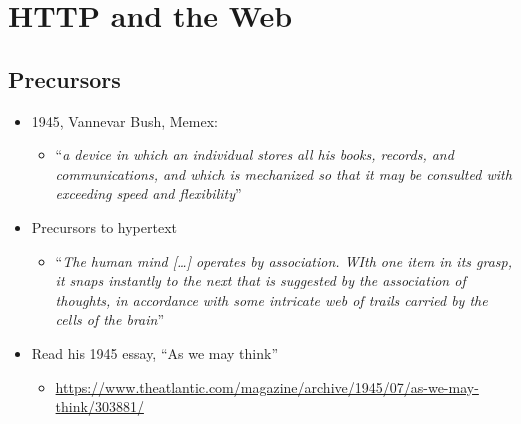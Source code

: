 \section{HTTP and the Web}
\subsection{Precursors}
\begin{itemize}[nosep]
    \item 1945, Vannevar Bush, Memex:
          \begin{itemize}[nosep]
              \item ``\textit{a device in which an individual stores all his books, records, and communications, and which is mechanized so that it may be consulted with exceeding speed and flexibility}''
          \end{itemize}
    \item Precursors to hypertext
          \begin{itemize}[nosep]
              \item ``\textit{The human mind [\dots] operates by association. WIth one item in its grasp, it snaps instantly to the next that is suggested by the association of thoughts, in accordance with some intricate web of trails carried by the cells of the brain}''
          \end{itemize}
    \item Read his 1945 essay, ``As we may think''
          \begin{itemize}[nosep]
              \item \url{https://www.theatlantic.com/magazine/archive/1945/07/as-we-may-think/303881/}
          \end{itemize}
\end{itemize}
